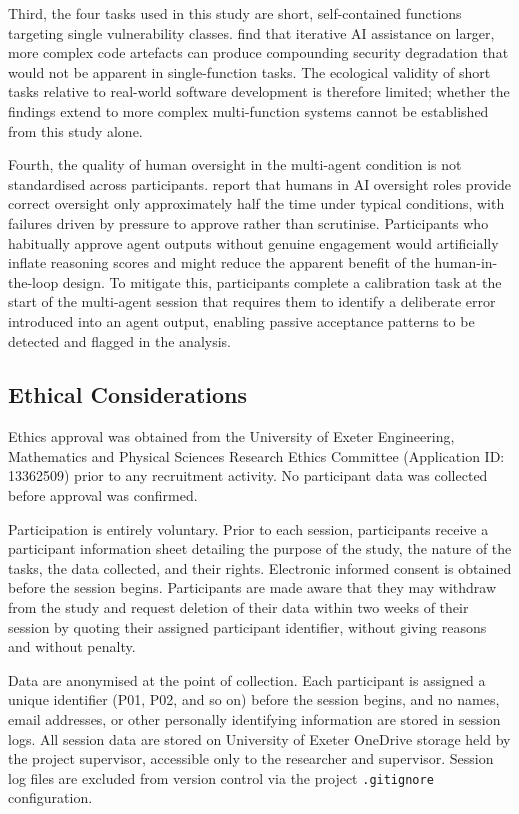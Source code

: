 Third, the four tasks used in this study are short, self-contained functions targeting single vulnerability classes. \citet{shukla2025} find that iterative AI assistance on larger, more complex code artefacts can produce compounding security degradation that would not be apparent in single-function tasks. The ecological validity of short tasks relative to real-world software development is therefore limited; whether the findings extend to more complex multi-function systems cannot be established from this study alone.

Fourth, the quality of human oversight in the multi-agent condition is not standardised across participants. \citet{kennedy2025} report that humans in AI oversight roles provide correct oversight only approximately half the time under typical conditions, with failures driven by pressure to approve rather than scrutinise. Participants who habitually approve agent outputs without genuine engagement would artificially inflate reasoning scores and might reduce the apparent benefit of the human-in-the-loop design. To mitigate this, participants complete a calibration task at the start of the multi-agent session that requires them to identify a deliberate error introduced into an agent output, enabling passive acceptance patterns to be detected and flagged in the analysis.

\subsection{Ethical Considerations}

Ethics approval was obtained from the University of Exeter Engineering, Mathematics and Physical Sciences Research Ethics Committee (Application ID: 13362509) prior to any recruitment activity. No participant data was collected before approval was confirmed.

Participation is entirely voluntary. Prior to each session, participants receive a participant information sheet detailing the purpose of the study, the nature of the tasks, the data collected, and their rights. Electronic informed consent is obtained before the session begins. Participants are made aware that they may withdraw from the study and request deletion of their data within two weeks of their session by quoting their assigned participant identifier, without giving reasons and without penalty.

Data are anonymised at the point of collection. Each participant is assigned a unique identifier (P01, P02, and so on) before the session begins, and no names, email addresses, or other personally identifying information are stored in session logs. All session data are stored on University of Exeter OneDrive storage held by the project supervisor, accessible only to the researcher and supervisor. Session log files are excluded from version control via the project \texttt{.gitignore} configuration.

